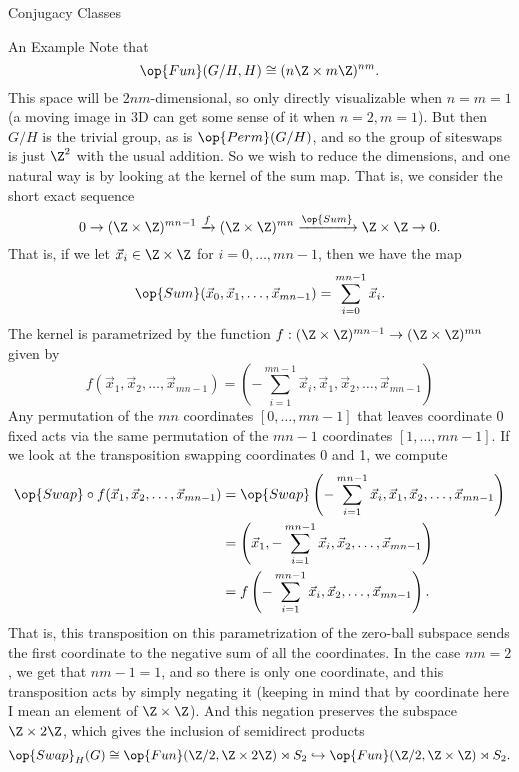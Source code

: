 \documentclass[12nt]{article}
\theoremstyle{plain}
\begin{document}
\begin{subsection}{Conjugacy Classes}
\begin{subsection}{An Example}
Note that \[
\op{Fun}(G/H, H) \cong (n\Z \times m\Z)^{nm}.
\]
This space will be $2nm$-dimensional, so only directly visualizable when $n = m = 1$ (a moving image in 3D can get some sense of it when $n = 2, m = 1$). But then $G/H$ is the trivial group, as is $\op{Perm}(G/H)$, and so the group of siteswaps is just $\Z^2$ with the usual addition. So we wish to reduce the dimensions, and one natural way is by looking at the kernel of the sum map. That is, we consider the short exact sequence
\[
0 \to (\Z \times \Z)^{mn - 1} \xrightarrow{f} (\Z \times \Z)^{mn} \xrightarrow{\op{Sum}} \Z \times \Z \to 0.
\]
That is, if we let $\vec{x}_i \in \Z \times \Z$ for $i = 0, \dots, mn - 1$, then we have the map
\[
\op{Sum}(\vec{x}_0, \vec{x}_1, \dots, \vec{x}_{mn-1}) = \sum \limits_{i=0}^{mn - 1} \vec{x}_i.
\]
The kernel is parametrized by the function $f : (\Z \times \Z)^{mn - 1} \to (\Z \times \Z)^{mn}$ given by
\[
f(\vec{x}_1, \vec{x}_2, \dots, \vec{x}_{mn - 1}) = \left(-\sum \limits_{i=1}^{mn - 1} \vec{x}_i, \vec{x}_1, \vec{x}_2, \dots, \vec{x}_{mn - 1} \right)
\]
Any permutation of the $mn$ coordinates $[0, \dots, mn - 1]$ that leaves coordinate 0 fixed acts via the same permutation of the $mn - 1$ coordinates $[1, \dots, mn - 1]$. If we look at the transposition swapping coordinates 0 and 1, we compute
\begin{align*}
\op{Swap} \circ f(\vec{x}_1, \vec{x}_2, \dots, \vec{x}_{mn - 1}) &= \op{Swap}\left(-\sum \limits_{i=1}^{mn - 1} \vec{x}_i, \vec{x}_1, \vec{x}_2, \dots, \vec{x}_{mn - 1} \right) \\
	&= \left(\vec{x}_1, -\sum \limits_{i=1}^{mn - 1} \vec{x}_i, \vec{x}_2, \dots, \vec{x}_{mn - 1} \right) \\
	&= f \left( -\sum \limits_{i=1}^{mn - 1} \vec{x}_i, \vec{x}_2, \dots, \vec{x}_{mn - 1} \right).
\end{align*}
That is, this transposition on this parametrization of the zero-ball subspace sends the first coordinate to the negative sum of all the coordinates. In the case $nm = 2$, we get that $nm - 1 = 1$, and so there is only one coordinate, and this transposition acts by simply negating it (keeping in mind that by coordinate here I mean an element of $\Z \times \Z$). And this negation preserves the subspace $\Z \times 2\Z$, which gives the inclusion of semidirect products \[\op{Swap}_H(G) \cong \op{Fun}(\Z/2, \Z \times 2\Z) \rtimes S_2 \hookrightarrow \op{Fun}(\Z/2, \Z \times \Z) \rtimes S_2.\] 

\end{subsection}






\end{subsection}
\end{document}

